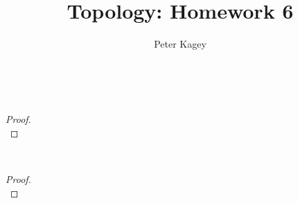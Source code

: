 \documentclass{article}
\newenvironment{problem}[2][Problem]{\begin{trivlist}
\item[\hskip \labelsep {\bfseries #1}\hskip \labelsep {\bfseries #2.}]}{\end{trivlist}}
\begin{document}
\title{Topology: Homework 6}
\author{Peter Kagey}

\maketitle

\begin{problem}{1} \text{} \\
\end{problem}

\begin{proof} \text{} \\
\end{proof}
\pagebreak
\begin{problem}{2} \text{} \\
\end{problem}

\begin{proof} \text{} \\
\end{proof}
\end{document}
